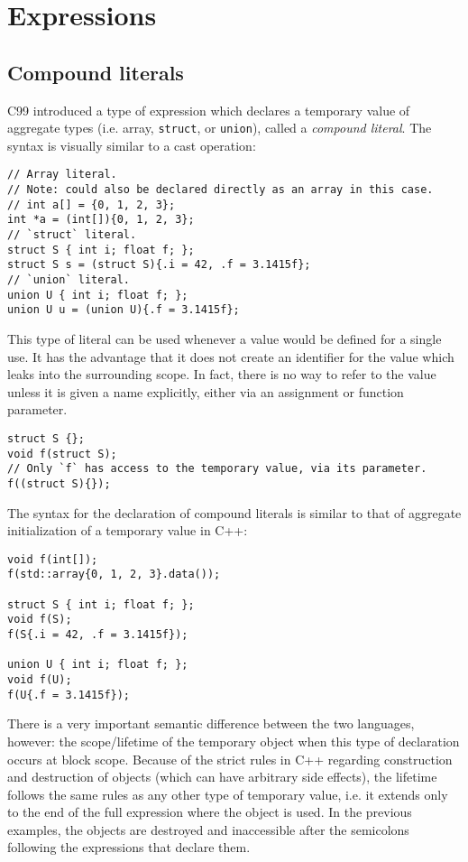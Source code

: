 \section{Expressions}

\subsection{Compound literals}

\label{subsec:c:literals}

C99 introduced a type of expression which declares a temporary value of
aggregate types (i.e.  array, \texttt{struct}, or \texttt{union}), called a
\textit{compound literal}.  The syntax is visually similar to a cast operation:

\begin{lstlisting}[style=c]
// Array literal.
// Note: could also be declared directly as an array in this case.
// int a[] = {0, 1, 2, 3};
int *a = (int[]){0, 1, 2, 3};
// `struct` literal.
struct S { int i; float f; };
struct S s = (struct S){.i = 42, .f = 3.1415f};
// `union` literal.
union U { int i; float f; };
union U u = (union U){.f = 3.1415f};
\end{lstlisting}

This type of literal can be used whenever a value would be defined for a single
use.  It has the advantage that it does not create an identifier for the value
which leaks into the surrounding scope.  In fact, there is no way to refer to
the value unless it is given a name explicitly, either via an assignment or
function parameter.

\begin{lstlisting}[style=c]
struct S {};
void f(struct S);
// Only `f` has access to the temporary value, via its parameter.
f((struct S){});
\end{lstlisting}

The syntax for the declaration of compound literals is similar to that of
aggregate initialization of a temporary value in C++:

\begin{lstlisting}[style=c++]
void f(int[]);
f(std::array{0, 1, 2, 3}.data());

struct S { int i; float f; };
void f(S);
f(S{.i = 42, .f = 3.1415f});

union U { int i; float f; };
void f(U);
f(U{.f = 3.1415f});
\end{lstlisting}

There is a very important semantic difference between the two languages,
however: the scope/lifetime of the temporary object when this type of
declaration occurs at block scope.  Because of the strict rules in C++ regarding
construction and destruction of objects (which can have arbitrary side effects),
the lifetime follows the same rules as any other type of temporary value, i.e.
it extends only to the end of the full expression where the object is used.  In
the previous examples, the objects are destroyed and inaccessible after the
semicolons following the expressions that declare them.

